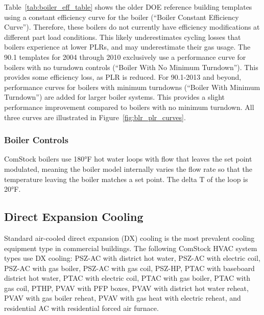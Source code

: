 Table~\ref{tab:boiler_eff_table} shows the older DOE reference building templates using a constant efficiency curve for the boiler (``Boiler Constant Efficiency Curve''). Therefore, these boilers do not currently have efficiency modifications at different part load conditions. This likely underestimates cycling losses that boilers experience at lower PLRs, and may underestimate their gas usage. The 90.1 templates for 2004 through 2010 exclusively use a performance curve for boilers with no turndown controls (``Boiler With No Minimum Turndown''). This provides some efficiency loss, as PLR is reduced. For 90.1-2013 and beyond, performance curves for boilers with minimum turndowns (``Boiler With Minimum Turndown'') are added for larger boiler systems. This provides a slight performance improvement compared to boilers with no minimum turndown. All three curves are illustrated in Figure~\ref{fig:blr_plr_curves}.




\subsubsection{Boiler Controls}

ComStock boilers use 180°F hot water loops with flow that leaves the set point modulated, meaning the boiler model internally varies the flow rate so that the temperature leaving the boiler matches a set point. The delta T of the loop is 20°F. %



\subsection{Direct Expansion Cooling}

Standard air-cooled direct expansion (DX) cooling is the most prevalent cooling equipment type in commercial buildings. The following ComStock HVAC system types use DX cooling: PSZ-AC with district hot water, PSZ-AC with electric coil, PSZ-AC with gas boiler, PSZ-AC with gas coil, PSZ-HP, PTAC with baseboard district hot water, PTAC with electric coil, PTAC with gas boiler, PTAC with gas coil, PTHP, PVAV with PFP boxes, PVAV with district hot water reheat, PVAV with gas boiler reheat, PVAV with gas heat with electric reheat, and residential AC with residential forced air furnace.

